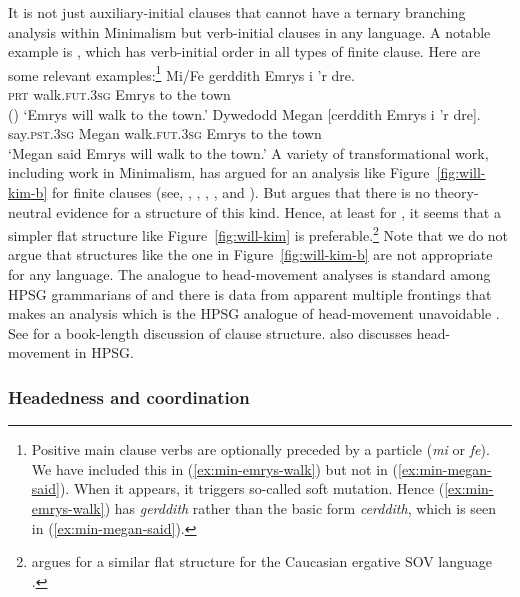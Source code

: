 \documentclass[output=paper
 	        ,biblatex
                ,babelshorthands
                ,newtxmath
                ,draftmode
                ,colorlinks, citecolor=brown
]{langscibook}
\begin{document}
It is not just  auxiliary-initial clauses that cannot have a ternary branching analysis
within Minimalism but verb-initial clauses in any language. A notable example is , which
has verb-initial order in all types of finite clause. Here are some relevant examples:\footnote{%
	Positive main clause verbs are optionally preceded by a particle (\emph{mi} or \emph{fe}). We have included this in (\ref{ex:min-emrys-walk}) but not in (\ref{ex:min-megan-said}). When it appears, it triggers so-called soft mutation. Hence (\ref{ex:min-emrys-walk}) has \emph{gerddith} rather than the basic form \emph{cerddith}, which is seen in (\ref{ex:min-megan-said}).
}
\eal
\ex\label{ex:min-emrys-walk}
\gll Mi/Fe gerddith Emrys i 'r dre.\\
     \textsc{prt} walk.\textsc{fut}.\textsc{3sg} Emrys to the town\\\hfill()
\glt `Emrys will walk to the town.'
\ex\label{ex:min-megan-said}
\gll Dywedodd Megan [cerddith Emrys i 'r dre].\\
     say.\textsc{pst}.\textsc{3sg} Megan \spacebr{}walk.\textsc{fut}.\textsc{3sg} Emrys to the town\\
\glt `Megan said Emrys will walk to the town.'
\zl
A variety of transformational work, including work in Minimalism, has argued for an analysis like Figure~\ref{fig:will-kim-b} for  finite clauses (see, \eg \citealt{JonesThomas.1977}, \citealt{Sproat.1985}, \citealt{Sadler.1988}, \citealt{Rouveret.1994}, and \citealt{Roberts.2005}). But \citet{Borsley.2006b} argues that there is no theory-neutral evidence for a structure of this kind. Hence, at least for , it seems that a simpler flat structure like Figure~\ref{fig:will-kim} is preferable.\footnote{%
	\citet{Borsley.2016} argues for a similar flat structure for the Caucasian ergative SOV language .%
} Note that we do not argue that structures like the one in Figure~\ref{fig:will-kim-b} are not
appropriate for any language. The analogue to head-movement analyses is standard among HPSG grammarians of  and there is data from apparent multiple
frontings that makes an analysis which is the HPSG analogue of head-movement unavoidable \citep{Mueller2003b,Mueller2005d}. See  for a
book-length discussion of  clause structure.  also discusses
head-movement in HPSG.


\subsubsection{Headedness and coordination}
\label{sec-coordination-minimalism}
\end{document}
